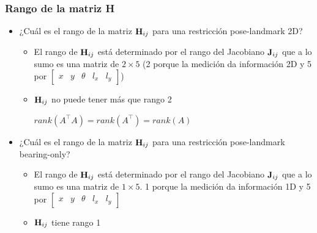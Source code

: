 \begin{frame}
    \frametitle{Rango de la matriz H}
    
    
    \begin{itemize}
        \item ¿Cuál es el rango de la matriz $\boldsymbol{\mathbf{H}}_{ij}$ para una restricción pose-landmark 2D?
        \begin{itemize}
            \item El rango de $\boldsymbol{\mathbf{H}}_{ij}$ está determinado por el rango del Jacobiano $\boldsymbol{\mathbf{J}}_{ij}$ que a lo sumo es una matriz de $2 \times 5$ (2 porque la medición da información 2D y 5 por $\begin{bmatrix}    x & y & \theta & l_{x} & l_{y} \end{bmatrix}$)
            \item $\boldsymbol{\mathbf{H}}_{ij}$ no puede tener más que rango 2
            
                $rank(A^{\top} A) = rank(A^{\top}) = rank(A)$
        \end{itemize}
    
        \item ¿Cuál es el rango de la matriz $\boldsymbol{\mathbf{H}}_{ij}$ para una restricción pose-landmark bearing-only?
        \begin{itemize}
            \item El rango de $\boldsymbol{\mathbf{H}}_{ij}$ está determinado por el rango del Jacobiano $\boldsymbol{\mathbf{J}}_{ij}$ que a lo sumo es una matriz de $1 \times 5$. 1 porque la medición da información 1D y 5 por $\begin{bmatrix}    x & y & \theta & l_{x} & l_{y} \end{bmatrix}$
            \item $\boldsymbol{\mathbf{H}}_{ij}$ tiene rango 1
        \end{itemize}
        
    \end{itemize}
\end{frame}


